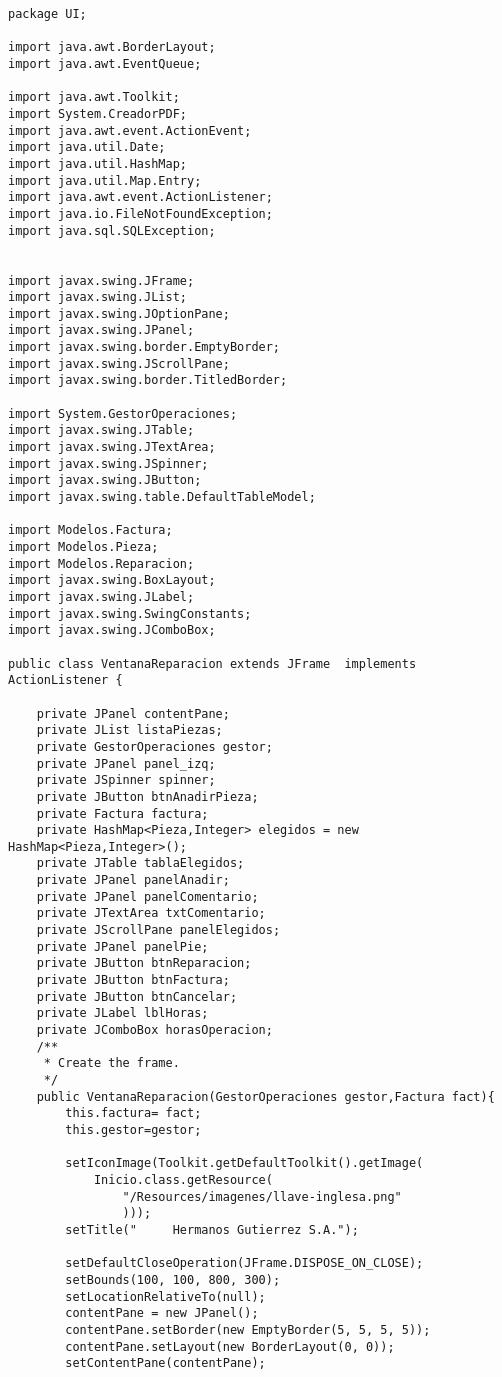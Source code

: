 \begin{lstlisting}[caption=VentanaReparacion.java (App Escritorio)]
package UI;

import java.awt.BorderLayout;
import java.awt.EventQueue;

import java.awt.Toolkit;
import System.CreadorPDF;
import java.awt.event.ActionEvent;
import java.util.Date;
import java.util.HashMap;
import java.util.Map.Entry;
import java.awt.event.ActionListener;
import java.io.FileNotFoundException;
import java.sql.SQLException;


import javax.swing.JFrame;
import javax.swing.JList;
import javax.swing.JOptionPane;
import javax.swing.JPanel;
import javax.swing.border.EmptyBorder;
import javax.swing.JScrollPane;
import javax.swing.border.TitledBorder;

import System.GestorOperaciones;
import javax.swing.JTable;
import javax.swing.JTextArea;
import javax.swing.JSpinner;
import javax.swing.JButton;
import javax.swing.table.DefaultTableModel;

import Modelos.Factura;
import Modelos.Pieza;
import Modelos.Reparacion;
import javax.swing.BoxLayout;
import javax.swing.JLabel;
import javax.swing.SwingConstants;
import javax.swing.JComboBox;

public class VentanaReparacion extends JFrame  implements ActionListener {

	private JPanel contentPane;
	private JList listaPiezas;
	private GestorOperaciones gestor;
	private JPanel panel_izq;
	private JSpinner spinner;
	private JButton btnAnadirPieza;
	private Factura factura;
	private HashMap<Pieza,Integer> elegidos = new HashMap<Pieza,Integer>();
	private JTable tablaElegidos;
	private JPanel panelAnadir;
	private JPanel panelComentario;
	private JTextArea txtComentario;
	private JScrollPane panelElegidos;
	private JPanel panelPie;
	private JButton btnReparacion;
	private JButton btnFactura;
	private JButton btnCancelar;
	private JLabel lblHoras;
	private JComboBox horasOperacion;
	/**
	 * Create the frame.
	 */
	public VentanaReparacion(GestorOperaciones gestor,Factura fact){
		this.factura= fact;
		this.gestor=gestor;

		setIconImage(Toolkit.getDefaultToolkit().getImage(
            Inicio.class.getResource( 
                "/Resources/imagenes/llave-inglesa.png" 
                )));	
		setTitle("     Hermanos Gutierrez S.A.");

		setDefaultCloseOperation(JFrame.DISPOSE_ON_CLOSE);
		setBounds(100, 100, 800, 300);
		setLocationRelativeTo(null);
		contentPane = new JPanel();
		contentPane.setBorder(new EmptyBorder(5, 5, 5, 5));
		contentPane.setLayout(new BorderLayout(0, 0));
		setContentPane(contentPane);
		

\end{lstlisting}
